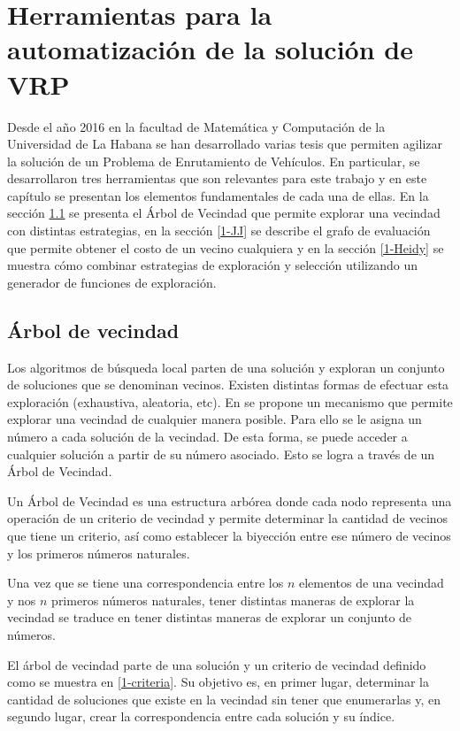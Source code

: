 \chapter{Herramientas para la automatización de la solución de VRP}\label{Chapter: Tools}
Desde el año 2016 \cite{Camila} en la facultad de Matemática y Computación de la Universidad de La Habana se han desarrollado varias tesis que permiten agilizar la solución de un Problema de Enrutamiento de Vehículos. En particular, se desarrollaron tres herramientas que son relevantes para este trabajo y en este capítulo se presentan los elementos fundamentales de cada una de ellas. En la sección \ref{1-Hector} se presenta el Árbol de Vecindad que permite explorar una vecindad con distintas estrategias, en la sección \ref{1-JJ} se describe el grafo de evaluación que permite obtener el costo de un vecino cualquiera y en la sección \ref{1-Heidy} se muestra cómo combinar estrategias de exploración y selección utilizando un generador de funciones de exploración.

\section{Árbol de vecindad}\label{1-Hector}
Los algoritmos de búsqueda local parten de una solución y exploran un conjunto de soluciones que se denominan vecinos. Existen distintas formas de efectuar esta exploración (exhaustiva, aleatoria, etc). En \cite{Hector} se propone un mecanismo que permite explorar una vecindad de cualquier manera posible. Para ello se le asigna un número a cada solución de la vecindad. De esta forma, se puede acceder a cualquier solución a partir de su número asociado. Esto se logra a través de un Árbol de Vecindad.

Un Árbol de Vecindad es una estructura arbórea donde cada nodo representa una operación de un criterio de vecindad y permite determinar la cantidad de vecinos que tiene un criterio, así como establecer la biyección entre ese número de vecinos y los primeros números naturales.

Una vez que se tiene una correspondencia entre los $n$ elementos de una vecindad y nos $n$ primeros números naturales, tener distintas maneras de explorar la vecindad se traduce en tener distintas maneras de explorar un conjunto de números. 

El árbol de vecindad parte de una solución y un criterio de vecindad definido como se muestra en \ref{1-criteria}. Su objetivo es, en primer lugar, determinar la cantidad de soluciones que existe en la vecindad sin tener que enumerarlas y, en segundo lugar, crear la correspondencia entre cada solución y su índice.

